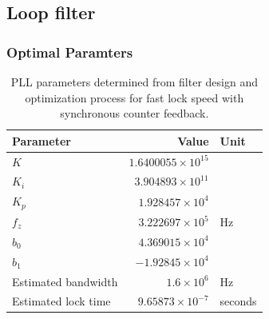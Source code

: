 \FloatBarrier\pagebreak
\subsection{Loop filter }\label{sec:rec_lf}
	\subsubsection{Optimal Paramters}
		\begin{table}[h!]
			\centering
			\def\arraystretch{1.5}		
			\setlength\arrayrulewidth{0.75pt}
			\setlength{\tabcolsep}{1em} %
			\begin{tabular}{|l|r|l|}
				\hline 
				\rule[-1ex]{0pt}{2.5ex} \cellcolor{gray!40}\textbf{Parameter} & \cellcolor{gray!40}\textbf{Value} & \cellcolor{gray!40}\textbf{Unit }\\ 
				\hline 
				\rule[-1ex]{0pt}{2.5ex} \textbf{$K$}  & $1.6400055\times10^{15}$ &  \\
				\hline 
				\rule[-1ex]{0pt}{2.5ex} \textbf{$K_i$}  & $3.904893\times10^{11}$ &  \\
				\hline 
				\rule[-1ex]{0pt}{2.5ex} \textbf{$K_p$}  & $1.928457\times10^4$ &  \\
				\hline 
				\rule[-1ex]{0pt}{2.5ex} \textbf{$f_z$} & $3.222697\times10^5$ & Hz\\
				\hline 
				\rule[-1ex]{0pt}{2.5ex} \textbf{$b_0$}  & $4.369015\times10^4$  &\\
				\hline 
				\rule[-1ex]{0pt}{2.5ex} \textbf{$b_1$}  & $-1.92845\times10^4$  & \\
				\hline 
				\rule[-1ex]{0pt}{2.5ex} Estimated bandwidth & $1.6\times10^6$ & Hz \\
				\hline 
				\rule[-1ex]{0pt}{2.5ex} Estimated lock time & $9.65873\times10^{-7}$ & seconds \\
				\hline 
			\end{tabular} 
			\caption{PLL parameters determined from filter design and optimization process for fast lock speed with synchronous counter feedback.}
			\label{filter_params_fast_lock}
		\end{table}   

